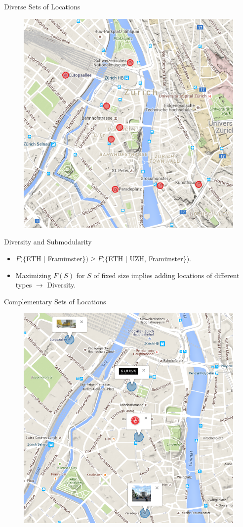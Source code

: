 \documentclass{beamer}
\begin{document}
\begin{frame}{Diverse Sets of Locations}
  \begin{figure}
    \centering
    \includegraphics[width=.6\textwidth]{diversity_set_3}
  \end{figure}
\end{frame}

\begin{frame}{Diversity and Submodularity}
  \begin{itemize}
    \item $F(\{$ETH | Framünster$\}) \geq F(\{$ETH | UZH, Framünster$\})$.
    \item Maximizing $F(S)$ for $S$ of fixed size implies adding locations of different types $\rightarrow$ Diversity.
  \end{itemize}
\end{frame}

\begin{frame}{Complementary Sets of Locations}
  \begin{figure}
    \centering
    \includegraphics[width=.6\textwidth]{coherent_set}
  \end{figure}
\end{frame}
\end{document}
